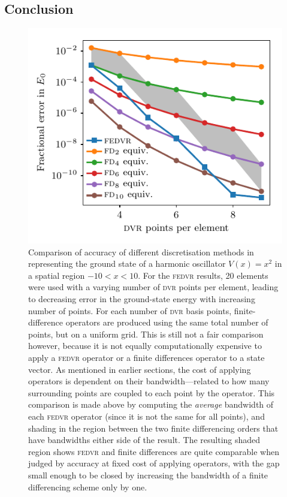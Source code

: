 \subsection{Conclusion}

\begin{figure}[t]
    \centerfloat
    \includegraphics{figures/numerics/fedvr_vs_fd_harmonic_groundstate.pdf}
    \caption{Comparison of accuracy of different discretisation methods in representing the ground state of a harmonic oscillator $V(x) = x^2$ in a spatial region $-10 < x < 10$. For the \textsc{fedvr} results, 20 elements were used with a varying number of \textsc{dvr} points per element, leading to decreasing error in the ground-state energy with increasing number of points. For each number of \textsc{dvr} basis points, finite-difference operators are produced using the same total number of points, but on a uniform grid. This is still not a fair comparison however, because it is not equally computationally expensive to apply a \textsc{fedvr} operator or a finite differences operator to a state vector. As mentioned in earlier sections, the cost of applying operators is dependent on their bandwidth---related to how many surrounding points are coupled to each point by the operator. This comparison is made above by computing the \emph{average} bandwidth of each \textsc{fedvr} operator (since it is not the same for all points), and shading in the region between the two finite differencing orders that have bandwidths either side of the result. The resulting shaded region shows \textsc{fedvr} and finite differences are quite comparable when judged by accuracy at fixed cost of applying operators, with the gap small enough to be closed by increasing the bandwidth of a finite differencing scheme only by one.}
    \label{fig:fedvr_vs_fd_harmonic_groundstate}
\end{figure}

